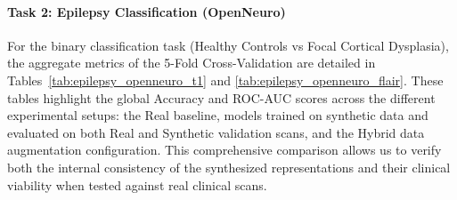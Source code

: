 \documentclass[11pt,a4paper]{article}
\begin{document}
\begin{table}[H]
\centering
{}
\vspace{2mm}
\caption{Downstream performance (Brain Age Estimation) for the \textbf{T1 $\rightarrow$ T2} translation. The table compares the MAE and Pearson correlation coefficient of the SFCN model evaluated through LOSO-CV (Guys, HH, IOP) when trained on Real T2 scans, purely Synthetic T2 scans, and a Hybrid data augmentation setup. The best results for each column are highlighted in \textbf{bold}.}
\label{tab:age_ixi_t2}
\end{table}

\paragraph{Task 2: Epilepsy Classification (OpenNeuro)}
For the binary classification task (Healthy Controls vs Focal Cortical Dysplasia), the aggregate metrics of the 5-Fold Cross-Validation are detailed in Tables~\ref{tab:epilepsy_openneuro_t1} and \ref{tab:epilepsy_openneuro_flair}. These tables highlight the global Accuracy and ROC-AUC scores across the different experimental setups: the Real baseline, models trained on synthetic data and evaluated on both Real and Synthetic validation scans, and the Hybrid data augmentation configuration. This comprehensive comparison allows us to verify both the internal consistency of the synthesized representations and their clinical viability when tested against real clinical scans.
\end{document}
